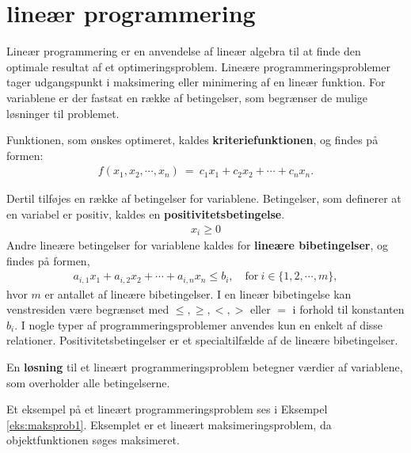 \chapter{lineær programmering}

Lineær programmering er en anvendelse af lineær algebra til at finde den optimale resultat af et optimeringsproblem. Lineære programmeringsproblemer tager udgangspunkt i maksimering eller minimering af en lineær funktion. For variablene er der fastsat en række af betingelser, som begrænser de mulige løsninger til problemet.



Funktionen, som ønskes optimeret, kaldes \textbf{kriteriefunktionen}, og findes på formen:
\begin{align}
f(x_1,x_2,\cdots , x_n)\ =\ c_1x_1 + c_2x_2 + \cdots + c_nx_n.
\end{align}

Dertil tilføjes en række af betingelser for variablene. Betingelser, som definerer at en variabel er positiv, kaldes en \textbf{positivitetsbetingelse}. 
\begin{align}
	x_i \geq 0
\end{align}
Andre lineære betingelser for variablene kaldes for \textbf{lineære bibetingelser}, og findes på formen, 
\begin{align}
	a_{i,1} x_1 + a_{i,2} x_2 + \cdots + a_{i,n} x_n \leq b_i, \quad \text{for} \ i \in \{1,2,\cdots, m\},
\end{align}
hvor $m$ er antallet af lineære bibetingelser. I en lineær bibetingelse kan venstresiden være begrænset med $\leq, \geq,<,>$ eller $=$ i forhold til konstanten $b_i$. I nogle typer af programmeringsproblemer anvendes kun en enkelt af disse relationer. Positivitetsbetingelser er et specialtilfælde af de lineære bibetingelser.

En \textbf{løsning} til et lineært programmeringsproblem betegner værdier af variablene, som overholder alle betingelserne.

Et eksempel på et lineært programmeringsproblem ses i Eksempel \ref{eks:maksprob1}. Eksemplet er et lineært maksimeringsproblem, da objektfunktionen søges maksimeret.

